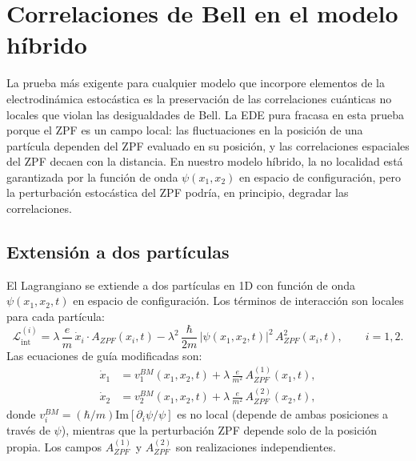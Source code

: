 \documentclass[11pt,a4paper]{article}
\begin{document}
\section{Correlaciones de Bell en el modelo híbrido}
\label{sec:bell}

La prueba más exigente para cualquier modelo que incorpore elementos de
la electrodinámica estocástica es la preservación de las correlaciones
cuánticas no locales que violan las desigualdades de Bell. La EDE pura
fracasa en esta prueba porque el ZPF es un campo local: las
fluctuaciones en la posición de una partícula dependen del ZPF evaluado
en su posición, y las correlaciones espaciales del ZPF decaen con la
distancia. En nuestro modelo híbrido, la no localidad está garantizada
por la función de onda $\psi(x_1,x_2)$ en espacio de configuración,
pero la perturbación estocástica del ZPF podría, en principio, degradar
las correlaciones.

\subsection{Extensión a dos partículas}
\label{sec:dos_particulas}

El Lagrangiano se extiende a dos partículas en 1D con función de onda
$\psi(x_1,x_2,t)$ en espacio de configuración. Los términos de
interacción son locales para cada partícula:
\begin{equation}
\mathcal{L}_\text{int}^{(i)} = \lambda\,\frac{e}{m}\,
\dot{x}_i\cdot A_{ZPF}(x_i,t)
- \lambda^2\,\frac{\hbar}{2m}\,|\psi(x_1,x_2,t)|^2\,
A^2_{ZPF}(x_i,t),
\qquad i=1,2.
\label{eq:Lint_dos}
\end{equation}
Las ecuaciones de guía modificadas son:
\begin{align}
\dot{x}_1 &= v_1^{BM}(x_1,x_2,t)
+ \lambda\,\frac{e}{m^2}\,A_{ZPF}^{(1)}(x_1,t),
\label{eq:guia_x1}\\
\dot{x}_2 &= v_2^{BM}(x_1,x_2,t)
+ \lambda\,\frac{e}{m^2}\,A_{ZPF}^{(2)}(x_2,t),
\label{eq:guia_x2}
\end{align}
donde $v_i^{BM}=(\hbar/m)\mathrm{Im}[\partial_i\psi/\psi]$ es no local
(depende de ambas posiciones a través de $\psi$), mientras que la
perturbación ZPF depende solo de la posición propia. Los campos
$A_{ZPF}^{(1)}$ y $A_{ZPF}^{(2)}$ son realizaciones independientes.
\end{document}
